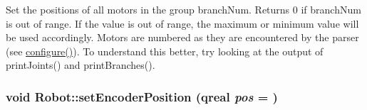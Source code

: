 Set the positions of all motors in the group branchNum. Returns 0 if branchNum is out of range. If the value is out of range, the maximum or minimum value will be used accordingly. Motors are numbered as they are encountered by the parser (see \hyperlink{class_robot_model_1_1_robot_a9ca9887b212f3233d101d95854cf2c79}{configure()}). To understand this better, try looking at the output of printJoints() and printBranches(). \hypertarget{class_robot_model_1_1_robot_a72ff62b72e0e9d34d3ca0c241dec50d3}{
\subsubsection[{setEncoderPosition}]{\setlength{\rightskip}{0pt plus 5cm}void Robot::setEncoderPosition (qreal {\em pos} = {})}}
\label{class_robot_model_1_1_robot_a72ff62b72e0e9d34d3ca0c241dec50d3}


